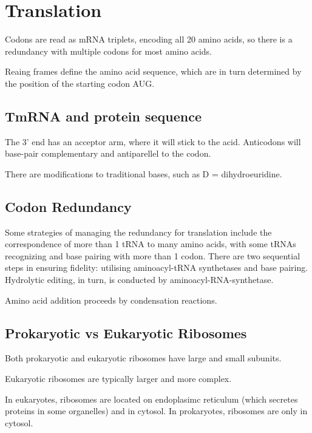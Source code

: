 \documentclass[11pt]{scrartcl}
\begin{document}
\section{Translation}

Codons are read as mRNA triplets, encoding all 20 amino acids, so
there is a redundancy with multiple codons for most amino acids.

Reaing frames define the amino acid sequence, which are in turn
determined by the position of the starting codon AUG.

\subsection{TmRNA and protein sequence}

The 3' end has an acceptor arm, where it will stick to the
acid. Anticodons will base-pair complementary and antiparellel to the
codon.

There are modifications to traditional bases, such as D =
dihydroeuridine.

\subsection{Codon Redundancy}


Some strategies of managing the redundancy for translation include the
correspondence of more than 1 tRNA to many amino acids, with some
tRNAs recognizing and base pairing with more than 1 codon.
There are two sequential steps in ensuring fidelity: utilising
aminoacyl-tRNA synthetases and base pairing. Hydrolytic editing, in
turn, is conducted by aminoacyl-RNA-synthetase.

Amino acid addition proceeds by condensation reactions.

\subsection{Prokaryotic vs Eukaryotic Ribosomes}

Both prokaryotic and eukaryotic ribosomes have large and small subunits.

Eukaryotic ribosomes are typically larger and more complex.

In eukaryotes, ribosomes are located on endoplasimc reticulum (which
secretes proteins in some organelles) and in cytosol. In prokaryotes, ribosomes are only in cytosol.
\end{document}

